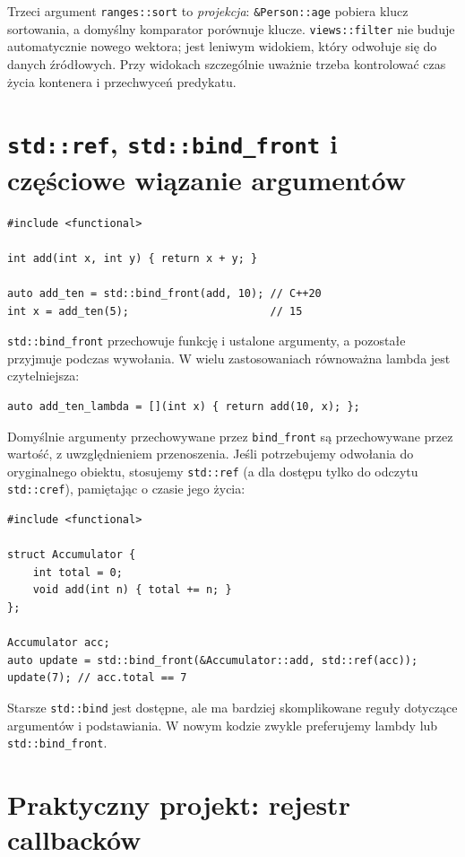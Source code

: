Trzeci argument \texttt{ranges::sort} to \emph{projekcja}:
\texttt{\&Person::age} pobiera klucz sortowania, a domyślny komparator
porównuje klucze. \texttt{views::filter} nie buduje automatycznie nowego
wektora; jest leniwym widokiem, który odwołuje się do danych źródłowych.
Przy widokach szczególnie uważnie trzeba kontrolować czas życia
kontenera i przechwyceń predykatu.

\section{\texttt{std::ref}, \texttt{std::bind\_front} i częściowe wiązanie argumentów}
\label{sec:bind-front}

\begin{lstlisting}
#include <functional>

int add(int x, int y) { return x + y; }

auto add_ten = std::bind_front(add, 10); // C++20
int x = add_ten(5);                      // 15
\end{lstlisting}

\texttt{std::bind\_front} przechowuje funkcję i ustalone argumenty,
a pozostałe przyjmuje podczas wywołania. W wielu zastosowaniach
równoważna lambda jest czytelniejsza:

\begin{lstlisting}
auto add_ten_lambda = [](int x) { return add(10, x); };
\end{lstlisting}

Domyślnie argumenty przechowywane przez \texttt{bind\_front} są
przechowywane przez wartość, z uwzględnieniem przenoszenia. Jeśli
potrzebujemy odwołania do oryginalnego obiektu, stosujemy
\texttt{std::ref} (a dla dostępu tylko do odczytu
\texttt{std::cref}), pamiętając o czasie jego życia:

\begin{lstlisting}
#include <functional>

struct Accumulator {
    int total = 0;
    void add(int n) { total += n; }
};

Accumulator acc;
auto update = std::bind_front(&Accumulator::add, std::ref(acc));
update(7); // acc.total == 7
\end{lstlisting}

Starsze \texttt{std::bind} jest dostępne, ale ma bardziej skomplikowane
reguły dotyczące argumentów i podstawiania. W nowym kodzie zwykle
preferujemy lambdy lub \texttt{std::bind\_front}.

\section{Praktyczny projekt: rejestr callbacków}
\label{sec:callbacks}

